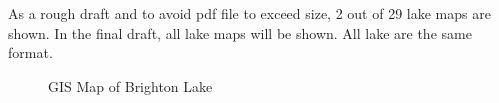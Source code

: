 

As a rough draft and to avoid pdf file to exceed size, 2 out of 29 lake maps are shown. In the final draft, all lake maps will be shown. All lake are the same format.

\clearpage
\newpage

\begin{figure}[t]
\centerline{%
  }
\caption{GIS Map of Brighton Lake}
\end{figure}

